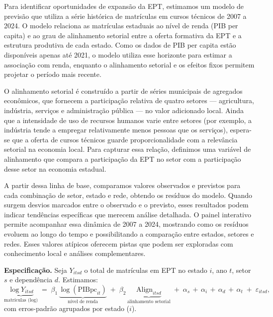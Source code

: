 Para identificar oportunidades de expansão da EPT, estimamos um modelo de previsão que utiliza a série histórica de matrículas em cursos técnicos de 2007 a 2024. O modelo relaciona as matrículas estaduais ao nível de renda (PIB per capita) e ao grau de alinhamento setorial entre a oferta formativa da EPT e a estrutura produtiva de cada estado. Como os dados de PIB per capita estão disponíveis apenas até 2021, o modelo utiliza esse horizonte para estimar a associação com renda, enquanto o alinhamento setorial e os efeitos fixos permitem projetar o período mais recente. 

O alinhamento setorial é construído a partir de séries municipais de agregados econômicos, que fornecem a participação relativa de quatro setores — agricultura, indústria, serviços e administração pública — no valor adicionado local. Ainda que a intensidade de uso de recursos humanos varie entre setores (por exemplo, a indústria tende a empregar relativamente menos pessoas que os serviços), espera-se que a oferta de cursos técnicos guarde proporcionalidade com a relevância setorial na economia local. Para capturar essa relação, definimos uma variável de alinhamento que compara a participação da EPT no setor com a participação desse setor na economia estadual.

A partir dessa linha de base, comparamos valores observados e previstos para cada combinação de setor, estado e rede, obtendo os resíduos do modelo. Quando surgem desvios marcados entre o observado e o previsto, esses resultados podem indicar tendências específicas que merecem análise detalhada. O painel interativo permite acompanhar essa dinâmica de 2007 a 2024, mostrando como os resíduos evoluem ao longo do tempo e possibilitando a comparação entre estados, setores e redes. Esses valores atípicos oferecem pistas que podem ser exploradas com conhecimento local e análises complementares.

\textbf{Especificação.}
Seja $Y_{itsd}$ o total de matrículas em EPT no estado $i$, ano $t$, setor $s$ e dependência $d$. Estimamos:
\[
\underbrace{\log Y_{itsd}}_{\text{matrículas (log)}} \;=\;
\beta_1\,\underbrace{\log(\text{PIBpc}_{it})}_{\text{nível de renda}}
\;+\;
\beta_2\,\underbrace{\text{Align}_{itsd}}_{\text{alinhamento setorial}}
\;+\;
\alpha_s \,+\, \alpha_i \,+\, \alpha_d \,+\, \alpha_t
\;+\; \varepsilon_{itsd},
\]
com erros-padrão agrupados por estado ($i$).

